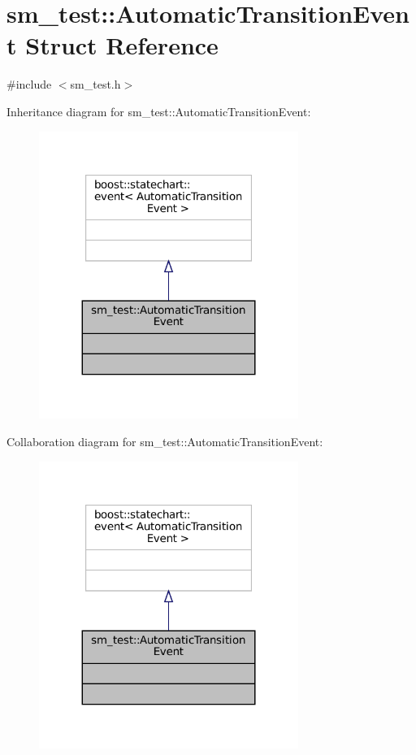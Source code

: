 \hypertarget{structsm__test_1_1AutomaticTransitionEvent}{}\section{sm\+\_\+test\+:\+:Automatic\+Transition\+Event Struct Reference}
\label{structsm__test_1_1AutomaticTransitionEvent}


{\ttfamily \#include $<$sm\+\_\+test.\+h$>$}



Inheritance diagram for sm\+\_\+test\+:\+:Automatic\+Transition\+Event\+:
\nopagebreak
\begin{figure}[H]
\begin{center}
\leavevmode
\includegraphics[width=239pt]{structsm__test_1_1AutomaticTransitionEvent__inherit__graph}
\end{center}
\end{figure}


Collaboration diagram for sm\+\_\+test\+:\+:Automatic\+Transition\+Event\+:
\nopagebreak
\begin{figure}[H]
\begin{center}
\leavevmode
\includegraphics[width=239pt]{structsm__test_1_1AutomaticTransitionEvent__coll__graph}
\end{center}
\end{figure}



